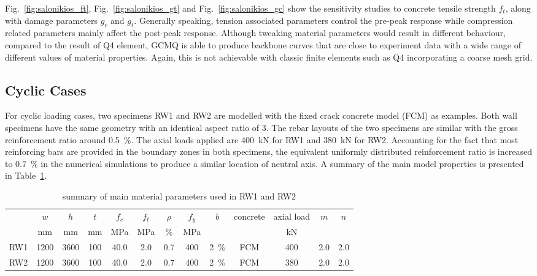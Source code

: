 \documentclass[3p,review,sort&compress,11pt,fleqn]{elsarticle}
\newcommand*{\figref}[1]{Fig.~\ref{#1}}
\newcommand*{\tabref}[1]{Table~\ref{#1}}
\begin{document}
\figref{fig:salonikios_ft}, \figref{fig:salonikios_gt} and \figref{fig:salonikios_gc} show the sensitivity studies to concrete tensile strength $f_t$, along with damage parameters $g_c$ and $g_t$. Generally speaking, tension associated parameters control the pre-peak response while compression related parameters mainly affect the post-peak response. Although tweaking material parameters would result in different behaviour, compared to the result of Q4 element, GCMQ is able to produce backbone curves that are close to experiment data with a wide range of different values of material properties. Again, this is not achievable with classic finite elements such as Q4 incorporating a coarse mesh grid.
\subsection{Cyclic Cases}
For cyclic loading cases, two specimens RW1 and RW2 \citep{Thomsen2004} are modelled with the fixed crack concrete model (FCM) as examples. Both wall specimens have the same geometry with an identical aspect ratio of \num{3}. The rebar layouts of the two specimens are similar with the gross reinforcement ratio around \SI{0.5}{\percent}. The axial loads applied are \SI{400}{\kilo\newton} for RW1 and \SI{380}{\kilo\newton} for RW2. Accounting for the fact that most reinforcing bars are provided in the boundary zones in both specimens, the equivalent uniformly distributed reinforcement ratio is increased to \SI{0.7}{\percent} in the numerical simulations to produce a similar location of neutral axis. A summary of the main model properties is presented in \tabref{tab:cyclic_parameter_summary}.
\begin{table}[htb]
\setlength{\tabcolsep}{3pt}
\scriptsize\centering\caption{summary of main material parameters used in RW1 and RW2}\label{tab:cyclic_parameter_summary}
\begin{tabular}{ccccccccccccc}
	\toprule
	    &        $w$        &        $h$        &        $t$        &       $f_c$       &       $f_t$       &    $\rho$     &       $f_y$       &       $b$        & concrete &    axial load     & $m$ & $n$ \\
	    & \si{\milli\metre} & \si{\milli\metre} & \si{\milli\metre} & \si{\mega\pascal} & \si{\mega\pascal} & \si{\percent} & \si{\mega\pascal} &                  &          & \si{\kilo\newton} &  \\ \midrule
	RW1 &       1200        &       3600        &        100        &       40.0        &        2.0        &      0.7      &        400        & \SI{2}{\percent} &   FCM    &        400        & 2.0 & 2.0 \\
	RW2 &       1200        &       3600        &        100        &       40.0        &        2.0        &      0.7      &        400        & \SI{2}{\percent} &   FCM    &        380        & 2.0 & 2.0 \\ \bottomrule
\end{tabular}
\end{table}
\end{document}
